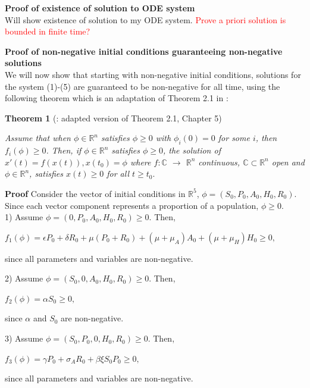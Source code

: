 \documentclass[12pt]{article}
\begin{document}
 \textbf{Proof of existence of solution to ODE system} \\
Will show existence of solution to my ODE system. \textcolor{red}{Prove a priori solution is bounded in finite time?}


\textbf{Proof of non-negative initial conditions guaranteeing non-negative solutions} \\
We will now show that starting with non-negative initial conditions, solutions for the system (1)-(5) are guaranteed to be non-negative for all time, using the following theorem which is an adaptation of Theorem 2.1 in \cite{Smith}: 
 
 \textbf{Theorem 1} (\cite{Smith}: adapted version of Theorem 2.1, Chapter 5) 

 \textit{Assume that when $\phi \in \mathbb{R}^n$ satisfies $\phi \geq 0$ with $\phi_{i}(0)=0$ for some $i$, then $f_i(\phi) \geq 0$. Then, if $\phi \in \mathbb{R}^n$ satisfies $\phi \geq 0$, the solution of $x'(t)=f(x(t)), x(t_{0})=\phi$ where $f: \mathbb{C}$ $\rightarrow$ $\mathbb{R}^n$ continuous, $\mathbb{C} \subset \mathbb{R}^n$ open and $\phi \in \mathbb{R}^n$, satisfies $x(t) \geq 0$ for all $t \geq t_{0}.$}
 
 \textbf{Proof} Consider the vector of initial conditions in $\mathbb{R}^5$, $\phi = (S_0, P_0, A_0, H_0, R_0).$ Since each vector component represents a proportion of a population, $\phi \geq 0.$ \\
 
1) Assume $\phi = (0, P_0, A_0, H_0, R_0) \geq 0.$ Then, 
\begin{center}
$f_1(\phi)=\epsilon P_0 +\delta R_0 + \mu (P_0+R_0)+(\mu + \mu_A) A_0 + (\mu+\mu_H) H_0 \geq 0,$
\end{center}
since all parameters and variables are non-negative. 
 
2) Assume $\phi = (S_0, 0, A_0, H_0, R_0) \geq 0.$ Then, 
\begin{center}
$f_2(\phi)=\alpha S_0 \geq 0,$
\end{center}
since $\alpha$ and $S_0$ are non-negative. 

3) Assume $\phi = (S_0, P_0, 0, H_0, R_0) \geq 0.$ Then,
\begin{center}
$f_3(\phi)=\gamma P_0 +\sigma_A R_0 + \beta \xi S_0 P_0 \geq 0,$
\end{center}
since all parameters and variables are non-negative. 
 
\end{document}
